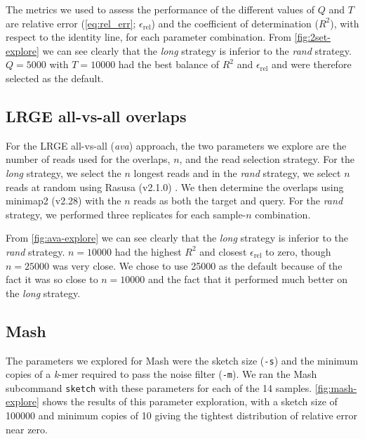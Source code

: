 \documentclass[unnumsec,webpdf,modern,large]{oup-authoring-template}
\theoremstyle{thmstyleone}%
\theoremstyle{thmstyletwo}%
\theoremstyle{thmstylethree}%
\newcommand{\lrge}{LRGE}
\newcommand{\relerr}{$\epsilon_{\text{rel}}$}
\newcommand{\ava}{\textit{ava}}
\newcommand{\kmer}{\textit{k}-mer}
\begin{document}
\begin{appendices}
The metrics we used to assess the performance of the different values of $Q$ and $T$ are relative error (\autoref{eq:rel_err}; \relerr{}) and the coefficient of determination ($R^2$), with respect to the identity line, for each parameter combination. From \autoref{fig:2set-explore} we can see clearly that the \textit{long} strategy is inferior to the \textit{rand} strategy. $Q=5000$ with $T=10000$ had the best balance of $R^2$ and \relerr{} and were therefore selected as the default.


\subsection{\lrge{} all-vs-all overlaps}\label{app:param_lrge_ava}

For the \lrge{} all-vs-all (\ava{}) approach, the two parameters we explore are the number of reads used for the overlaps, $n$, and the read selection strategy. For the \textit{long} strategy, we select the $n$ longest reads and in the \textit{rand} strategy, we select $n$ reads at random using Rasusa (v2.1.0) \citep{hall_rasusa_2022}. We then determine the overlaps using minimap2 (v2.28) \citep{li_minimap2_2018} with the $n$ reads as both the target and query. For the \textit{rand} strategy, we performed three replicates for each sample-$n$ combination.

From \autoref{fig:ava-explore} we can see clearly that the \textit{long} strategy is inferior to the \textit{rand} strategy. $n=10000$ had the highest $R^2$ and closest \relerr{} to zero, though $n=25000$ was very close. We chose to use 25000 as the default because of the fact it was so close to $n=10000$ and the fact that it performed much better on the \textit{long} strategy.



\subsection{Mash}\label{app:param_mash}

The parameters we explored for Mash \citep{ondov_mash_2016} were the sketch size (\verb|-s|) and the minimum copies of a \kmer{} required to pass the noise filter (\verb|-m|). We ran the Mash subcommand \texttt{sketch} with these parameters for each of the 14 samples. \autoref{fig:mash-explore} shows the results of this parameter exploration, with a sketch size of 100000 and minimum copies of 10 giving the tightest distribution of relative error near zero.



\end{appendices}
\end{document}

